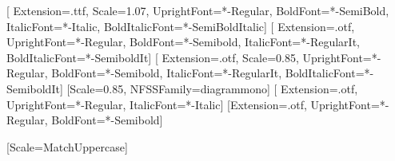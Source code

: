 
\usepackage[paperwidth=504bp, paperheight=661.5bp,
            textwidth=378bp, inner=63bp, top=66bp, textheight=523bp,
            headheight=12bp, headsep=23bp, footskip=34bp]{geometry}

\usepackage{fix-cm}   %
\usepackage{fontspec}
\setmainfont{CrimsonPro}[
  Extension=.ttf, Scale=1.07,
  UprightFont=*-Regular, BoldFont=*-SemiBold,
  ItalicFont=*-Italic,   BoldItalicFont=*-SemiBoldItalic]
\setsansfont{SourceSans3}[
  Extension=.otf,
  UprightFont=*-Regular,  BoldFont=*-Semibold,
  ItalicFont=*-RegularIt, BoldItalicFont=*-SemiboldIt]
\setmonofont{SourceCodePro}[
  Extension=.otf, Scale=0.85,
  UprightFont=*-Regular,  BoldFont=*-Semibold,
  ItalicFont=*-RegularIt, BoldItalicFont=*-SemiboldIt]
\newfontfamily{}[Scale=0.85, NFSSFamily=diagrammono]
\newfontfamily{}[
  Extension=.otf, UprightFont=*-Regular, ItalicFont=*-Italic]
\newfontfamily{}[Extension=.otf, UprightFont=*-Regular, BoldFont=*-Semibold]
\newfontfamily{}

\usepackage{amsmath}
\usepackage{unicode-math}
[Scale=MatchUppercase]
\setlength{\abovedisplayskip}{9pt}\setlength{\belowdisplayskip}{9pt}
\setlength{\abovedisplayshortskip}{4pt}\setlength{\belowdisplayshortskip}{6pt}

